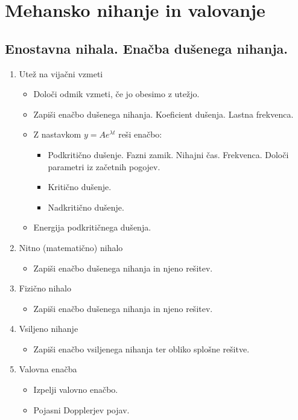 \section{Mehansko nihanje in valovanje}
\subsection{Enostavna nihala. Enačba dušenega nihanja.}

\begin{enumerate}
    \item Utež na vijačni vzmeti
    
    \begin{itemize}
        \item Določi odmik vzmeti, če jo obesimo z utežjo.
        \item Zapiši enačbo dušenega nihanja. Koeficient dušenja. Lastna frekvenca.
        \item Z nastavkom \(y = Ae^{\lambda t}\) reši enačbo:
        \begin{itemize}
            \item Podkritično dušenje. Fazni zamik. Nihajni čas. Frekvenca.  Določi parametri iz začetnih pogojev.
            \item Kritično dušenje. 
            \item Nadkritično dušenje.
        \end{itemize}
        \item Energija podkritičnega dušenja.
    \end{itemize}

    \item Nitno (matematično) nihalo
    \begin{itemize}
        \item Zapiši enačbo dušenega nihanja in njeno rešitev.
    \end{itemize}

    \item Fizično nihalo
    \begin{itemize}
        \item Zapiši enačbo dušenega nihanja in njeno rešitev.
    \end{itemize}

    \item Vsiljeno nihanje
    \begin{itemize}
        \item Zapiši enačbo vsiljenega nihanja ter obliko splošne rešitve.
    \end{itemize}

    \item Valovna enačba
    \begin{itemize}
        \item Izpelji valovno enačbo.
        \item Pojasni Dopplerjev pojav.
    \end{itemize}
\end{enumerate}